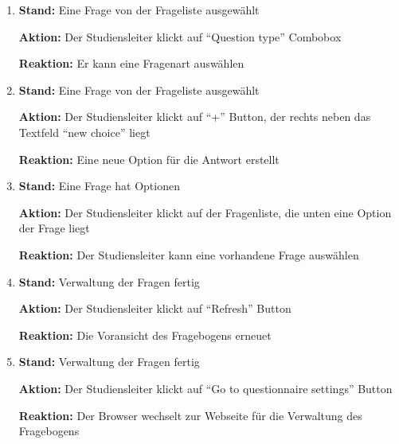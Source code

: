 \documentclass[a4paper]{scrreprt}
\begin{document}
\begin{itemize}
\begin{enumerate}
                        \item \par \textbf{Stand: } Eine Frage von der Frageliste ausgewählt
                              \par \textbf{Aktion: } Der \gls{Studiensleiter} klickt auf ``Question type'' Combobox
                              \par \textbf{Reaktion: } Er kann eine Fragenart auswählen

                        \item \par \textbf{Stand: }  Eine Frage von der Frageliste ausgewählt
                              \par \textbf{Aktion: } Der \gls{Studiensleiter} klickt auf ``+'' Button, der rechts neben das Textfeld ``new choice'' liegt
                              \par \textbf{Reaktion: } Eine neue Option für die Antwort erstellt

                        \item \par \textbf{Stand: } Eine Frage hat Optionen
                              \par \textbf{Aktion: } Der \gls{Studiensleiter} klickt auf der Fragenliste, die unten eine Option der Frage liegt
                              \par \textbf{Reaktion: }Der \gls{Studiensleiter} kann eine vorhandene Frage auswählen

                        \item \par \textbf{Stand: }  Verwaltung der Fragen fertig
                              \par \textbf{Aktion: } Der \gls{Studiensleiter} klickt auf ``Refresh'' Button
                              \par \textbf{Reaktion: } Die Voransicht des Fragebogens erneuet

                        \item \par \textbf{Stand: } Verwaltung der Fragen fertig
                              \par \textbf{Aktion: } Der \gls{Studiensleiter} klickt auf ``Go to questionnaire settings'' Button
                              \par \textbf{Reaktion: } Der Browser wechselt zur Webseite für die Verwaltung des Fragebogens        


\end{enumerate}
\end{itemize}
\end{document}

